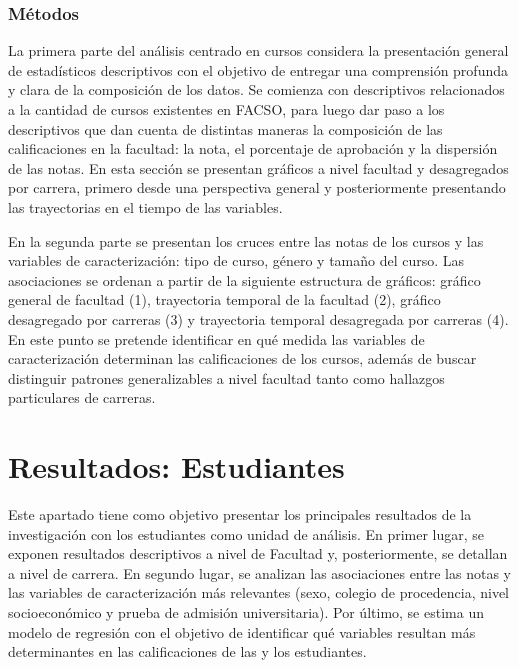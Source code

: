 \documentclass[
  spanish,
  a4paper,
  oneside]{scrbook}
\begin{document}
\subsection{Métodos}\label{muxe9todos-1}

La primera parte del análisis centrado en cursos considera la
presentación general de estadísticos descriptivos con el objetivo de
entregar una comprensión profunda y clara de la composición de los
datos. Se comienza con descriptivos relacionados a la cantidad de cursos
existentes en FACSO, para luego dar paso a los descriptivos que dan
cuenta de distintas maneras la composición de las calificaciones en la
facultad: la nota, el porcentaje de aprobación y la dispersión de las
notas. En esta sección se presentan gráficos a nivel facultad y
desagregados por carrera, primero desde una perspectiva general y
posteriormente presentando las trayectorias en el tiempo de las
variables.

En la segunda parte se presentan los cruces entre las notas de los
cursos y las variables de caracterización: tipo de curso, género y
tamaño del curso. Las asociaciones se ordenan a partir de la siguiente
estructura de gráficos: gráfico general de facultad (1), trayectoria
temporal de la facultad (2), gráfico desagregado por carreras (3) y
trayectoria temporal desagregada por carreras (4). En este punto se
pretende identificar en qué medida las variables de caracterización
determinan las calificaciones de los cursos, además de buscar distinguir
patrones generalizables a nivel facultad tanto como hallazgos
particulares de carreras.


\chapter{Resultados: Estudiantes}\label{resultados-estudiantes}

Este apartado tiene como objetivo presentar los principales resultados
de la investigación con los estudiantes como unidad de análisis. En
primer lugar, se exponen resultados descriptivos a nivel de Facultad y,
posteriormente, se detallan a nivel de carrera. En segundo lugar, se
analizan las asociaciones entre las notas y las variables de
caracterización más relevantes (sexo, colegio de procedencia, nivel
socioeconómico y prueba de admisión universitaria). Por último, se
estima un modelo de regresión con el objetivo de identificar qué
variables resultan más determinantes en las calificaciones de las y los
estudiantes.
\end{document}
